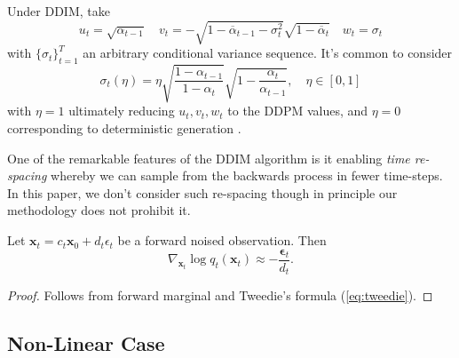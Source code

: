 \begin{remark} \label{rem:ddim}
    Under DDIM, take
    \begin{equation*}
        u_t = \sqrt{\alpha_{t-1}} \quad
        v_t = -\sqrt{1 - \overline{\alpha}_{t-1} - \sigma_t^2}\sqrt{1 - \overline{\alpha}_t} \quad
        w_t = \sigma_t
    \end{equation*}
    with $\{\sigma_t\}_{t=1}^T$ an arbitrary conditional variance sequence. It's common to consider
    \begin{equation*}
        \sigma_t(\eta) = \eta\sqrt{\frac{1 - \alpha_{t-1}}{1 - \alpha_t}}\sqrt{1 - \frac{\alpha_t}{\alpha_{t-1}}},\quad \eta \in [0,1]
    \end{equation*}
    with $\eta=1$ ultimately reducing $u_t, v_t, w_t$ to the DDPM values, and $\eta=0$ corresponding
    to deterministic generation \parencite{songDenoisingDiffusionImplicit2020}.
\end{remark}

\begin{remark} \label{rem:time-respacing}
    One of the remarkable features of the DDIM algorithm is it enabling \emph{time re-spacing}
    whereby we can sample from the backwards process in fewer time-steps. In this paper, we don't
    consider such re-spacing though in principle our methodology does not prohibit it.
\end{remark}

\begin{proposition} \label{prop:score-to-noise}
    Let $\mathbf{x}_t = c_t\mathbf{x}_0 + d_t\epsilon_t$ be a forward noised observation. Then
    $$
    \nabla_{\mathbf{x}_t} \log q_t(\mathbf{x}_t) \approx -\frac{\mathbf{\epsilon}_t}{d_t}.
    $$
\end{proposition}
\begin{proof}
    Follows from forward marginal and Tweedie's formula (\autoref{eq:tweedie}).
\end{proof}

\subsection{Non-Linear Case} \label{sec:non-linear}

